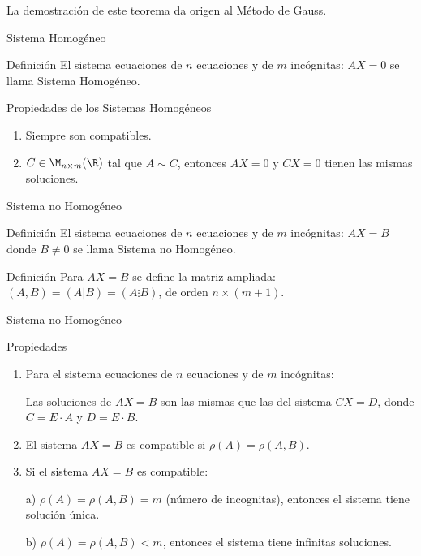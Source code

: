 La demostración de este teorema da origen al Método de Gauss.


{Sistema Homogéneo}

\begin{block}{Definición}
El sistema ecuaciones de $n$ ecuaciones y de $m$ incógnitas:
$AX=0$ se llama Sistema Homogéneo.
\end{block}

\begin{block}{Propiedades de los Sistemas Homogéneos}
\begin{enumerate}
\item
Siempre son compatibles.

\item
$C \in \M_{n\times m}(\R)$ tal que $A\sim C$, entonces 
$AX=0$  y $CX=0$ tienen las mismas soluciones.
\end{enumerate}
\end{block}


{Sistema no Homogéneo}
\begin{block}{Definición}
El sistema ecuaciones de $n$ ecuaciones y de $m$ incógnitas:
$AX=B$ donde $B \neq 0$ se llama Sistema no Homogéneo.
\end{block}

\begin{block}{Definición}
Para $AX=B$ se define la matriz ampliada: $(A,B)= (A|B)=(A\vdots B)$, de orden $n\times (m+1)$.
\end{block}


{Sistema no Homogéneo}
\begin{block}{Propiedades}
\begin{enumerate}
\item
Para el sistema ecuaciones de $n$ ecuaciones y de $m$ incógnitas:

Las soluciones de $AX=B$ son las mismas que las del sistema $CX=D$, donde $C = E\cdot A$ y $D= E\cdot B$.

\item
El sistema  $AX=B$ es compatible si $\rho(A) = \rho(A,B)$.

\item
Si el sistema  $AX=B$ es compatible:

a) $\rho(A) = \rho(A,B) = m$ (número de incognitas), entonces el sistema tiene solución única.

b) $\rho(A) = \rho(A,B) < m$, entonces el sistema tiene infinitas soluciones.

\end{enumerate}
\end{block}


